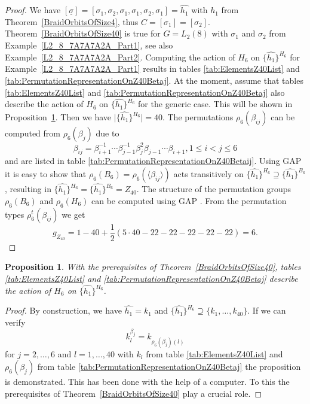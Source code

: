 \documentclass[12pt,a4paper]{article}
\newtheorem{proposition}{Proposition}[section]
\numberwithin{equation}{section}
\numberwithin{table}{section}
\begin{document}
\begin{proof} We have
$[\underline{\sigma}] = [\sigma_1, \sigma_2, \sigma_1, \sigma_1, \sigma_2, \sigma_1] = \widehat{h_1}$ with $h_1$ from Theorem~\ref{BraidOrbitsOfSize4},
thus $C = [\sigma_1] = [\sigma_2]$.
Theorem~\ref{BraidOrbitsOfSize40} is true for $G=L_2(8)$ with $\sigma_1$ and $\sigma_2$
from Example~\ref{L2_8_7A7A7A2A_Part1}, see also Example~\ref{L2_8_7A7A7A2A_Part2}.
Computing the action of $H_6$ on $\{ \widehat{h_1} \}^{H_6}$
for Example~\ref{L2_8_7A7A7A2A_Part1} results in tables \ref{tab:ElementsZ40List} and \ref{tab:PermutationRepresentationOnZ40Betaj}.
At the moment, assume that tables \ref{tab:ElementsZ40List} and \ref{tab:PermutationRepresentationOnZ40Betaj}
also describe the action of $H_6$ on $\{ \widehat{h_1} \}^{H_6}$ for the generic case. This will be shown in Proposition~\ref{BraidOrbitAction40}.
Then we have $\vert \{ \widehat{h_1} \}^{H_6} \vert = 40$.
The permutations $\rho_6(\beta_{ij})$ can be computed from $\rho_6(\beta_j)$ due to
$$\beta_{ij} = \beta_{i+1}^{-1} \cdots \beta_{j-1}^{-1} \beta_j^2 \beta_{j-1} \cdots \beta_{i+1}, 1 \leq i < j \leq 6$$
and are listed in table \ref{tab:PermutationRepresentationOnZ40Betaij}.
Using GAP \cite{RefGAP} it is easy to show that
$\rho_6(B_6) = \rho_6(\langle \beta_{ij} \rangle)$ acts transitively on 
$\{ \widehat{h_1} \}^{H_6} \supseteq \{ \widehat{h_1} \}^{B_6}$, 
resulting in $\{ \widehat{h_1} \}^{H_6} = \{ \widehat{h_1} \}^{B_6} = Z_{40}$.
The structure of the permutation groups $\rho_6(B_6)$ and $\rho_6(H_6)$ can be computed using GAP \cite{RefGAP}.
From the permutation types $\rho^t_6(\beta_{ij})$ we get
$$g_{Z_{40}}= 1 - 40 + \frac{1}{2}(5\cdot 40 -22 -22 -22 -22 -22) = 6.$$
\end{proof}
%
\begin{proposition}
\label{BraidOrbitAction40}
With the prerequisites of Theorem~\ref{BraidOrbitsOfSize40}, tables \ref{tab:ElementsZ40List} and \ref{tab:PermutationRepresentationOnZ40Betaj}
describe the action of $H_6$ on $\{ \widehat{h_1} \}^{H_6}$.
\end{proposition}
\begin{proof}
By construction, we have $\widehat{h_1} = k_1$ and $\{ \widehat{h_1} \}^{H_6} \supseteq \{ k_1,\dots,k_{40} \}$.
If we can verify
$$k_l^{\beta_j} = k_{\rho_6(\beta_j)(l)}$$
for $j=2,\dots,6$ and $l=1,\dots,40$ with $k_l$ from table \ref{tab:ElementsZ40List} 
and $\rho_6(\beta_j)$ from table \ref{tab:PermutationRepresentationOnZ40Betaj} the proposition is demonstrated.
This has been done with the help of a computer.
To this the prerequisites of Theorem~\ref{BraidOrbitsOfSize40} play a crucial role.
\end{proof}
\end{document}
